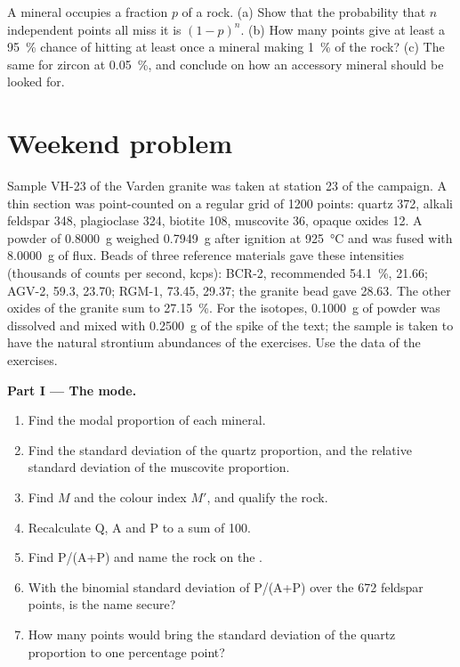 \begin{exercise}[$\star\star\star$]\label{exo:b2:field-lab-methods-2:12}
A mineral occupies a fraction $p$ of a rock. (a) Show that the probability that $n$ independent
points all miss it is $(1-p)^n$. (b) How many points give at least a \qty{95}{\percent} chance of
hitting at least once a mineral making \qty{1}{\percent} of the rock? (c) The same for zircon at
\qty{0.05}{\percent}, and conclude on how an accessory mineral should be looked for.
\end{exercise}

\section*{Weekend problem}

\begin{problem}\label{pb:b2:field-lab-methods-2:1}
Sample VH-23 of the Varden granite was taken at station 23 of the campaign. A thin section was
point-counted on a regular grid of 1200 points: quartz 372, alkali feldspar 348, plagioclase 324,
biotite 108, muscovite 36, opaque oxides 12. A powder of \qty{0.8000}{g} weighed \qty{0.7949}{g}
after ignition at \qty{925}{\celsius} and was fused with \qty{8.0000}{g} of flux. Beads of three
reference materials gave these  intensities (thousands of counts per second, kcps): BCR-2,
recommended \qty{54.1}{\percent}, 21.66; AGV-2, 59.3, 23.70; RGM-1, 73.45, 29.37; the granite bead
gave 28.63. The other oxides of the granite sum to \qty{27.15}{\percent}. For the isotopes,
\qty{0.1000}{g} of powder was dissolved and mixed with \qty{0.2500}{g} of the spike of the text;
the sample is taken to have the natural strontium abundances of the exercises. Use the data of the
exercises.

\noindent\textbf{Part I --- The mode.}
\begin{enumerate}
  \item Find the modal proportion of each mineral.
  \item Find the standard deviation of the quartz proportion, and the relative standard deviation
        of the muscovite proportion.
  \item Find $M$ and the colour index $M'$, and qualify the rock.
  \item Recalculate Q, A and P to a sum of 100.
  \item Find P/(A+P) and name the rock on the .
  \item With the binomial standard deviation of P/(A+P) over the 672 feldspar points, is the name
        secure?
  \item How many points would bring the standard deviation of the quartz proportion to one
        percentage point?
\end{enumerate}


\end{problem}
